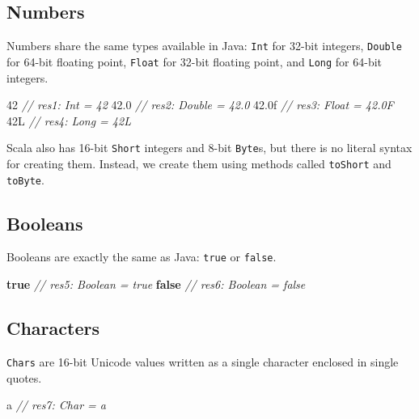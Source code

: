 \documentclass[11pt,a5paper,]{book}
\newenvironment{Shaded}{\begin{snugshade}}{\end{snugshade}}
\newcommand{\CharTok}[1]{\textcolor[rgb]{0.31,0.60,0.02}{#1}}
\newcommand{\CommentTok}[1]{\textcolor[rgb]{0.56,0.35,0.01}{\textit{#1}}}
\newcommand{\DecValTok}[1]{\textcolor[rgb]{0.00,0.00,0.81}{#1}}
\newcommand{\FloatTok}[1]{\textcolor[rgb]{0.00,0.00,0.81}{#1}}
\newcommand{\KeywordTok}[1]{\textcolor[rgb]{0.13,0.29,0.53}{\textbf{#1}}}
\newcommand{\NormalTok}[1]{#1}
\begin{document}
\hypertarget{numbers}{%
\subsection{Numbers}\label{numbers}}

Numbers share the same types available in Java: \texttt{Int} for 32-bit
integers, \texttt{Double} for 64-bit floating point, \texttt{Float} for
32-bit floating point, and \texttt{Long} for 64-bit integers.

\begin{Shaded}
\begin{Highlighting}[]
\DecValTok{42}
\CommentTok{// res1: Int = 42}
\FloatTok{42.0}
\CommentTok{// res2: Double = 42.0}
\FloatTok{42.0f}
\CommentTok{// res3: Float = 42.0F}
\NormalTok{42L}
\CommentTok{// res4: Long = 42L}
\end{Highlighting}
\end{Shaded}

Scala also has 16-bit \texttt{Short} integers and 8-bit \texttt{Byte}s,
but there is no literal syntax for creating them. Instead, we create
them using methods called \texttt{toShort} and \texttt{toByte}.

\hypertarget{booleans}{%
\subsection{Booleans}\label{booleans}}

Booleans are exactly the same as Java: \texttt{true} or \texttt{false}.

\begin{Shaded}
\begin{Highlighting}[]
\KeywordTok{true}
\CommentTok{// res5: Boolean = true}
\KeywordTok{false}
\CommentTok{// res6: Boolean = false}
\end{Highlighting}
\end{Shaded}

\hypertarget{characters}{%
\subsection{Characters}\label{characters}}

\texttt{Chars} are 16-bit Unicode values written as a single character
enclosed in single quotes.

\begin{Shaded}
\begin{Highlighting}[]
\CharTok{\textquotesingle{}a\textquotesingle{}}
\CommentTok{// res7: Char = \textquotesingle{}a\textquotesingle{}}
\end{Highlighting}
\end{Shaded}
\end{document}

